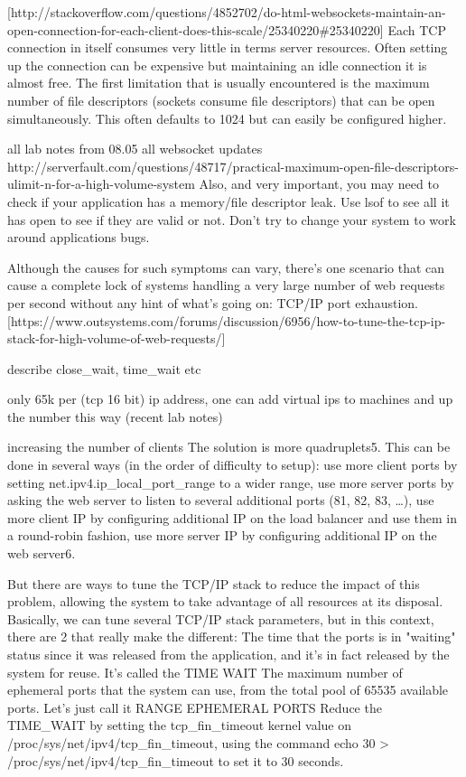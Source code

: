 \documentclass{uvamscse}
\begin{document}
[http://stackoverflow.com/questions/4852702/do-html-websockets-maintain-an-open-connection-for-each-client-does-this-scale/25340220\#25340220]
Each TCP connection in itself consumes very little in terms server resources. Often setting up the connection can be expensive but maintaining an idle connection it is almost free. The first limitation that is usually encountered is the maximum number of file descriptors (sockets consume file descriptors) that can be open simultaneously. This often defaults to 1024 but can easily be configured higher.

all lab notes from 08.05
all websocket updates
http://serverfault.com/questions/48717/practical-maximum-open-file-descriptors-ulimit-n-for-a-high-volume-system
Also, and very important, you may need to check if your application has a memory/file descriptor leak. Use lsof to see all it has open to see if they are valid or not. Don't try to change your system to work around applications bugs.

Although the causes for such symptoms can vary, there's one scenario that can cause a complete lock of systems handling a very large number of web requests per second without any hint of what's going on: TCP/IP port exhaustion. [https://www.outsystems.com/forums/discussion/6956/how-to-tune-the-tcp-ip-stack-for-high-volume-of-web-requests/]

describe close\_wait, time\_wait etc

only 65k per (tcp 16 bit) ip address, one can add virtual ips to machines and up the number this way
(recent lab notes)

increasing the number of clients
The solution is more quadruplets5. This can be done in several ways (in the order of difficulty to setup):
use more client ports by setting net.ipv4.ip\_local\_port\_range to a wider range,
use more server ports by asking the web server to listen to several additional ports (81, 82, 83, …),
use more client IP by configuring additional IP on the load balancer and use them in a round-robin fashion,
use more server IP by configuring additional IP on the web server6.

But there are ways to tune the TCP/IP stack to reduce the impact of this problem, allowing the system to take advantage of all resources at its disposal. Basically, we can tune several TCP/IP stack parameters, but in this context, there are 2 that really make the different:
The time that the ports is in "waiting" status since it was released from the application, and it's in fact released by the system for reuse. It's called the TIME WAIT
The maximum number of ephemeral ports that the system can use, from the total pool of 65535 available ports. Let's just call it RANGE EPHEMERAL PORTS
Reduce the TIME\_WAIT by setting the tcp\_fin\_timeout kernel value on /proc/sys/net/ipv4/tcp\_fin\_timeout, using the command echo 30 > /proc/sys/net/ipv4/tcp\_fin\_timeout to set it to 30 seconds.
\end{document}
